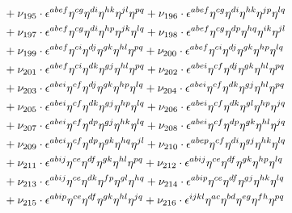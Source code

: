 \documentclass[a4paper,12pt, DIV=14, BCOR=5mm, twoside, headsepline, numbers=noenddot]{scrbook}
\begin{document}
\begin{align}
\begin{alignedat}{2}
& & &\hphantom{=}
+\nu_{195}\cdot\epsilon^{abef}\eta^{cg}\eta^{di}\eta^{hk}\eta^{jl}\eta^{pq}+\nu_{196}\cdot\epsilon^{abef}\eta^{cg}\eta^{di}\eta^{hk}\eta^{jp}\eta^{lq}\\
& & &\hphantom{=}
+\nu_{197}\cdot\epsilon^{abef}\eta^{cg}\eta^{di}\eta^{hp}\eta^{jk}\eta^{lq}+\nu_{198}\cdot\epsilon^{abef}\eta^{cg}\eta^{dp}\eta^{hq}\eta^{ik}\eta^{jl}\\
& & &\hphantom{=}
+\nu_{199}\cdot\epsilon^{abef}\eta^{ci}\eta^{dj}\eta^{gk}\eta^{hl}\eta^{pq}+\nu_{200}\cdot\epsilon^{abef}\eta^{ci}\eta^{dj}\eta^{gk}\eta^{hp}\eta^{lq}\\
& & &\hphantom{=}
+\nu_{201}\cdot\epsilon^{abef}\eta^{ci}\eta^{dk}\eta^{gj}\eta^{hl}\eta^{pq}+\nu_{202}\cdot\epsilon^{abei}\eta^{cf}\eta^{dj}\eta^{gk}\eta^{hl}\eta^{pq}\\
& & &\hphantom{=}
+\nu_{203}\cdot\epsilon^{abei}\eta^{cf}\eta^{dj}\eta^{gk}\eta^{hp}\eta^{lq}+\nu_{204}\cdot\epsilon^{abei}\eta^{cf}\eta^{dk}\eta^{gj}\eta^{hl}\eta^{pq}\\
& & &\hphantom{=}
+\nu_{205}\cdot\epsilon^{abei}\eta^{cf}\eta^{dk}\eta^{gj}\eta^{hp}\eta^{lq}+\nu_{206}\cdot\epsilon^{abei}\eta^{cf}\eta^{dk}\eta^{gl}\eta^{hp}\eta^{jq}\\
& & &\hphantom{=}
+\nu_{207}\cdot\epsilon^{abei}\eta^{cf}\eta^{dp}\eta^{gj}\eta^{hk}\eta^{lq}+\nu_{208}\cdot\epsilon^{abei}\eta^{cf}\eta^{dp}\eta^{gk}\eta^{hl}\eta^{jq}\\
& & &\hphantom{=}
+\nu_{209}\cdot\epsilon^{abei}\eta^{cf}\eta^{dp}\eta^{gk}\eta^{hq}\eta^{jl}+\nu_{210}\cdot\epsilon^{abep}\eta^{cf}\eta^{di}\eta^{gj}\eta^{hk}\eta^{lq}\\
& & &\hphantom{=}
+\nu_{211}\cdot\epsilon^{abij}\eta^{ce}\eta^{df}\eta^{gk}\eta^{hl}\eta^{pq}+\nu_{212}\cdot\epsilon^{abij}\eta^{ce}\eta^{df}\eta^{gk}\eta^{hp}\eta^{lq}\\
& & &\hphantom{=}
+\nu_{213}\cdot\epsilon^{abij}\eta^{ce}\eta^{dk}\eta^{fp}\eta^{gl}\eta^{hq}+\nu_{214}\cdot\epsilon^{abip}\eta^{ce}\eta^{df}\eta^{gj}\eta^{hk}\eta^{lq}\\
& & &\hphantom{=}
+\nu_{215}\cdot\epsilon^{abip}\eta^{ce}\eta^{df}\eta^{gk}\eta^{hl}\eta^{jq}+\nu_{216}\cdot\epsilon^{ijkl}\eta^{ac}\eta^{bd}\eta^{eg}\eta^{fh}\eta^{pq}
\end{alignedat}
\end{align}
\end{document}
